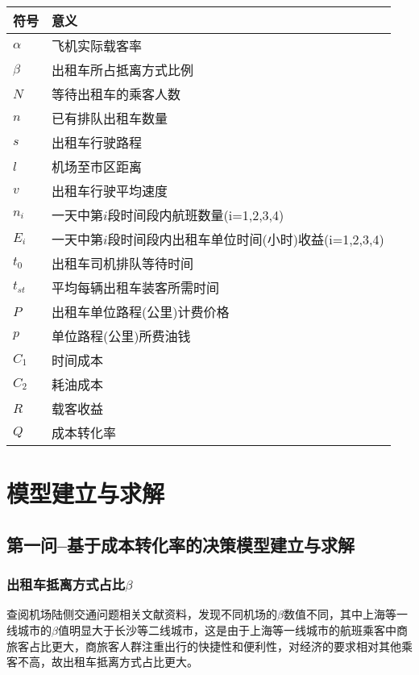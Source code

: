 \documentclass[withoutpreface,bwprint]{cumcmthesis} %
\begin{document}
\begin{table}[htbp] 
	\centering
	\begin{tabular}{p{7.5cm}<{\centering} p{7.5cm}<{\centering}} 
		\toprule[1.5pt]
		符号 & 意义\\ 
		\midrule 

	$\alpha$ 	 & 飞机实际载客率\\
	$\beta$		& 出租车所占抵离方式比例\\
	$N$			&等待出租车的乘客人数\\
	$n$			&已有排队出租车数量\\
	$s$  		 &出租车行驶路程\\
    $l$			&机场至市区距离\\
	$v$  		  &出租车行驶平均速度\\
	$n_i$			&一天中第$i$段时间段内航班数量(i=1,2,3,4)\\
	$E_i$			&一天中第$i$段时间段内出租车单位时间(小时)收益(i=1,2,3,4)\\
	$t_0$			&出租车司机排队等待时间\\
	$t_{st}$		&平均每辆出租车装客所需时间\\
	$P$			&出租车单位路程(公里)计费价格\\
	$p$				&单位路程(公里)所费油钱\\
		
	$C_1$				&时间成本\\
	$C_2$				&耗油成本\\
	$R$			   &载客收益\\
	$Q$				&成本转化率\\

  	

		\bottomrule[1.5pt] 
	\end{tabular} 
\end{table}






\section{模型建立与求解}
\subsection{第一问--基于成本转化率的决策模型建立与求解}





\subsubsection{出租车抵离方式占比$\beta$}
查阅机场陆侧交通问题相关文献资料\cite{bib:one}，发现不同机场的$\beta$数值不同，其中上海等一线城市的$\beta$值明显大于长沙等二线城市，这是由于上海等一线城市的航班乘客中商旅客占比更大，商旅客人群注重出行的快捷性和便利性，对经济的要求相对其他乘客不高，故出租车抵离方式占比更大。
\end{document}
